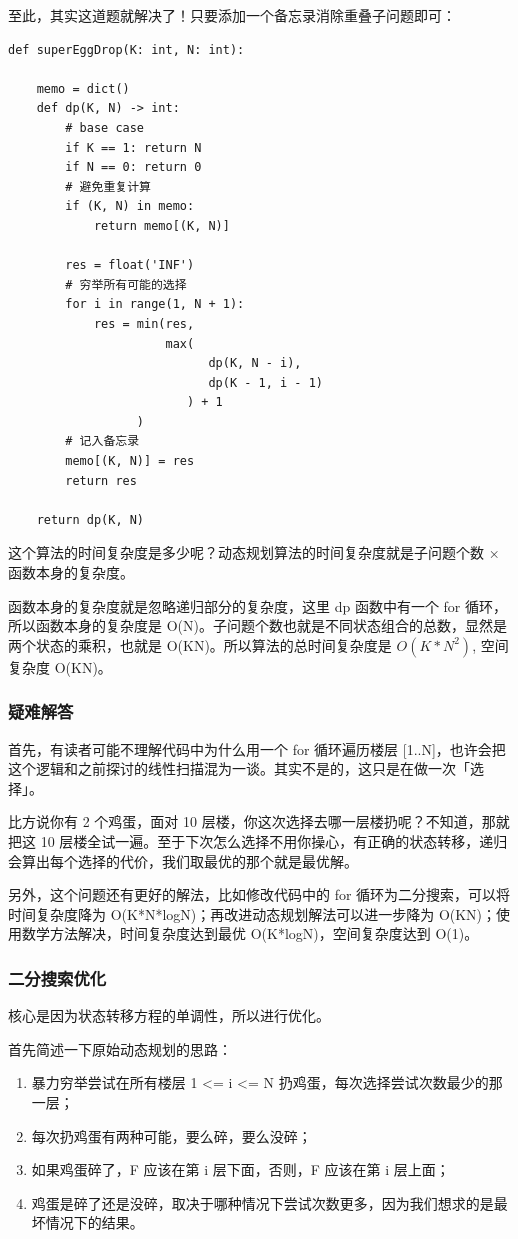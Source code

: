 \documentclass[12pt]{article}
\begin{document}
至此，其实这道题就解决了！只要添加一个备忘录消除重叠子问题即可：
\begin{lstlisting}
def superEggDrop(K: int, N: int):

    memo = dict()
    def dp(K, N) -> int:
        # base case
        if K == 1: return N
        if N == 0: return 0
        # 避免重复计算
        if (K, N) in memo:
            return memo[(K, N)]

        res = float('INF')
        # 穷举所有可能的选择
        for i in range(1, N + 1):
            res = min(res, 
                      max(
                            dp(K, N - i), 
                            dp(K - 1, i - 1)
                         ) + 1
                  )
        # 记入备忘录
        memo[(K, N)] = res
        return res
    
    return dp(K, N)
\end{lstlisting}
这个算法的时间复杂度是多少呢？动态规划算法的时间复杂度就是子问题个数 × 函数本身的复杂度。


函数本身的复杂度就是忽略递归部分的复杂度，这里 dp 函数中有一个 for 循环，所以函数本身的复杂度是 O(N)。子问题个数也就是不同状态组合的总数，显然是两个状态的乘积，也就是 O(KN)。所以算法的总时间复杂度是 $O(K*N^2)$, 空间复杂度 O(KN)。

\subsubsection{疑难解答}
首先，有读者可能不理解代码中为什么用一个 for 循环遍历楼层 [1..N]，也许会把这个逻辑和之前探讨的线性扫描混为一谈。其实不是的，这只是在做一次「选择」。

比方说你有 2 个鸡蛋，面对 10 层楼，你这次选择去哪一层楼扔呢？不知道，那就把这 10 层楼全试一遍。至于下次怎么选择不用你操心，有正确的状态转移，递归会算出每个选择的代价，我们取最优的那个就是最优解。

另外，这个问题还有更好的解法，比如修改代码中的 for 循环为二分搜索，可以将时间复杂度降为 O(K*N*logN)；再改进动态规划解法可以进一步降为 O(KN)；使用数学方法解决，时间复杂度达到最优 O(K*logN)，空间复杂度达到 O(1)。

\subsubsection{二分搜索优化}
核心是因为状态转移方程的单调性，所以进行优化。

首先简述一下原始动态规划的思路：
\begin{enumerate}
\setlength{\itemsep}{0pt}
\setlength{\parsep}{0pt}
\setlength{\parskip}{0pt}
    \item 暴力穷举尝试在所有楼层 1 <= i <= N 扔鸡蛋，每次选择尝试次数最少的那一层；
    \item 每次扔鸡蛋有两种可能，要么碎，要么没碎；
    \item 如果鸡蛋碎了，F 应该在第 i 层下面，否则，F 应该在第 i 层上面；
    \item 鸡蛋是碎了还是没碎，取决于哪种情况下尝试次数更多，因为我们想求的是最坏情况下的结果。
\end{enumerate}
\end{document}
